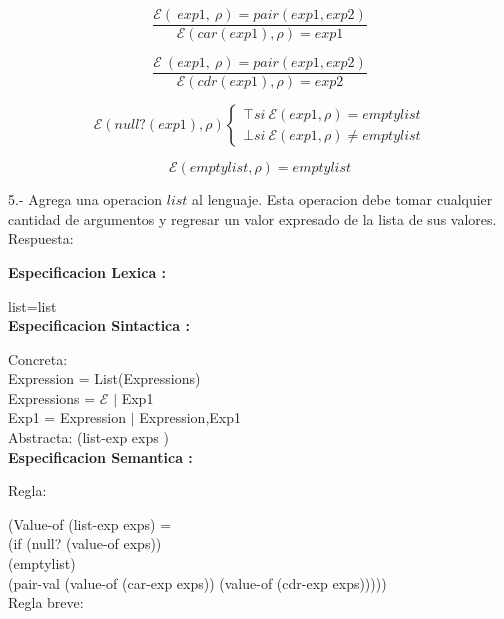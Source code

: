 \documentclass{article}
\begin{document}
$$
\frac{\mathcal{E} (\: {exp1} ,  \: \rho) = pair (exp1 , exp2) }{\mathcal{E} (car (exp1),\rho)= exp1}
$$

$$
\frac{\mathcal{E} \: ({exp1} ,  \: \rho) = pair (exp1 , exp2) }{\mathcal{E} (cdr (exp1),\rho)= exp2}
$$


$$
\mathcal{E}(null?(exp1),\rho)
\begin{cases}
   \top si \: \mathcal{E}(exp1, \rho) = emptylist \\
   \bot si \: \mathcal{E}(exp1, \rho) \not = emptylist
\end{cases}
$$

$$\mathcal{E}(emptylist,\rho) = emptylist $$ 


5.- Agrega una operacion $list$ al lenguaje. Esta operacion debe tomar cualquier cantidad de argumentos y regresar un valor expresado de la lista de sus valores.\newline
Respuesta: \newline

\textbf{Especificacion Lexica :} \newline

list=list\\

\textbf{Especificacion Sintactica :} \newline

Concreta: \\

Expression = List(Expressions)\\

Expressions = $\mathcal{E}$ $|$ Exp1 \\

Exp1 = Expression $|$ Expression,Exp1 \\

Abstracta: (list-exp exps ) \\

\textbf{Especificacion Semantica :} \newline

Regla: \newline

(Value-of (list-exp exps) = \\
    (if (null? (value-of exps)) \\
        (emptylist)\\
        (pair-val (value-of (car-exp exps)) (value-of (cdr-exp exps))))) \\


Regla breve: \newline
\end{document}
